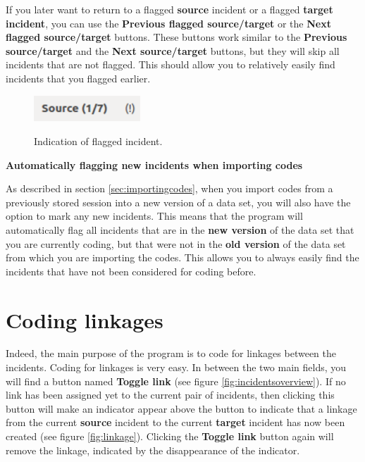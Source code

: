 \documentclass{memoir}
\begin{document}
If you later want to return to a flagged \textbf{source} incident or a flagged \textbf{target incident}, you can use the \textbf{Previous flagged source/target} or the \textbf{Next flagged source/target} buttons. These buttons work similar to the \textbf{Previous source/target} and the \textbf{Next source/target} buttons, but they will skip all incidents that are not flagged. This should allow you to relatively easily find incidents that you flagged earlier.

\begin{figure}[h!]
  \centering
  \caption{Indication of flagged incident.}
  \includegraphics[width=40mm]{Screenshot_9.pdf}
  \label{fig:flaggedincident}
\end{figure}


\begin{framed}
\textbf{Automatically flagging new incidents when importing codes}
  
  As described in section \ref{sec:importingcodes}, when you import codes from a previously stored session into a new version of a data set, you will also have the option to mark any new incidents. This means that the program will automatically flag all incidents that are in the \textbf{new version} of the data set that you are currently coding, but that were not in the \textbf{old version} of the data set from which you are importing the codes. This allows you to always easily find the incidents that have not been considered for coding before. 
\end{framed}


\section{Coding linkages}
\label{sec:codinglinkages}

Indeed, the main purpose of the program is to code for linkages between the incidents. Coding for linkages is very easy. In between the two main fields, you will find a button named \textbf{Toggle link} (see figure \ref{fig:incidentsoverview}). If no link has been assigned yet to the current pair of incidents, then clicking this button will make an indicator appear above the button to indicate that a linkage from the current \textbf{source} incident to the current \textbf{target} incident has now been created (see figure \ref{fig:linkage}). Clicking the \textbf{Toggle link} button again will remove the linkage, indicated by the disappearance of the indicator.
\end{document}
